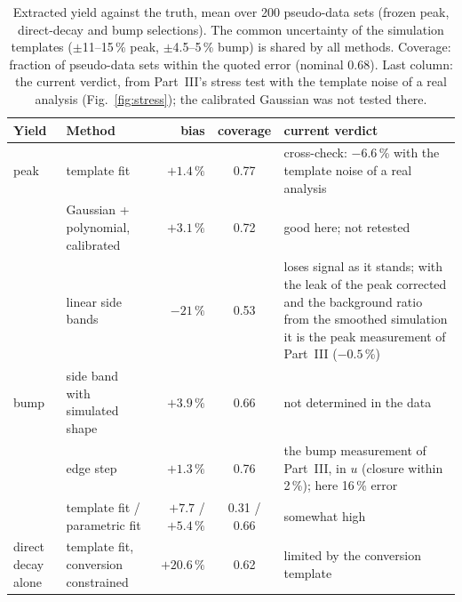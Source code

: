 \documentclass[11pt,a4paper]{article}
\begin{document}
\begin{table}[!htb]
\centering
\caption{Extracted yield against the truth, mean over 200 pseudo-data sets (frozen peak, direct-decay and bump selections).
The common uncertainty of the simulation templates ($\pm$11--15\,\% peak, $\pm$4.5--5\,\% bump) is shared by all methods.
Coverage: fraction of pseudo-data sets within the quoted error (nominal 0.68). Last column: the current verdict, from
Part~III's stress test with the template noise of a real analysis (Fig.~\ref{fig:stress}); the calibrated Gaussian was not
tested there.}
\label{tab:blind}
\small
\begin{tabularx}{\textwidth}{@{}>{\raggedright\arraybackslash}p{2.0cm} >{\raggedright\arraybackslash}p{3.9cm} r c L@{}}
\toprule
Yield & Method & bias & coverage & current verdict \\
\midrule
peak   & template fit                         & $+1.4\,\%$  & 0.77 & cross-check: $-6.6$\,\% with the template noise of a real analysis \\
       & Gaussian + polynomial, calibrated    & $+3.1\,\%$  & 0.72 & good here; not retested \\
       & linear side bands                    & $-21\,\%$   & 0.53 & loses signal as it stands; with the leak of the peak corrected and the background ratio from the smoothed simulation it is the peak measurement of Part~III ($-0.5$\,\%) \\
bump   & side band with simulated shape       & $+3.9\,\%$  & 0.66 & not determined in the data \\
       & edge step                            & $+1.3\,\%$  & 0.76 & the bump measurement of Part~III, in $u$ (closure within 2\,\%); here 16\,\% error \\
       & template fit / parametric fit        & $+7.7$ / $+5.4\,\%$ & 0.31 / 0.66 & somewhat high \\
direct decay alone & template fit, conversion constrained & $+20.6\,\%$ & 0.62 & limited by the conversion template \\
\bottomrule
\end{tabularx}
\end{table}
\end{document}
